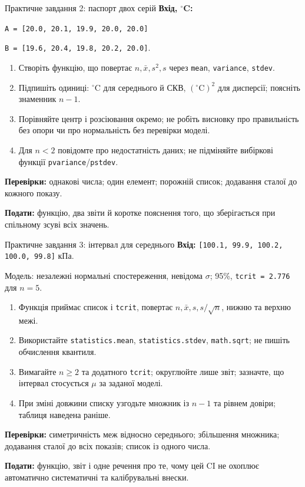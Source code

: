\documentclass[aspectratio=169,11pt]{beamer}
\begin{document}
\begin{frame}{Практичне завдання 2: паспорт двох серій}
\small
\textbf{Вхід, $^\circ$C:}\par
\texttt{A = [20.0, 20.1, 19.9, 20.0, 20.0]}\par
\texttt{B = [19.6, 20.4, 19.8, 20.2, 20.0]}.
\begin{enumerate}
\item Створіть функцію, що повертає $n,\bar x,s^2,s$ через \texttt{mean}, \texttt{variance}, \texttt{stdev}.
\item Підпишіть одиниці: $^\circ$C для середнього й СКВ, $({}^\circ\mathrm C)^2$ для дисперсії; поясніть знаменник $n-1$.
\item Порівняйте центр і розсіювання окремо; не робіть висновку про правильність без опори чи про нормальність без перевірки моделі.
\item Для $n<2$ повідомте про недостатність даних; не підміняйте вибіркові функції \texttt{pvariance}/\texttt{pstdev}.
\end{enumerate}
\textbf{Перевірки:} однакові числа; один елемент; порожній список; додавання сталої до кожного показу.
\medskip

\textbf{Подати:} функцію, два звіти й коротке пояснення того, що зберігається при спільному зсуві всіх значень.
\end{frame}

\begin{frame}{Практичне завдання 3: інтервал для середнього}
\small
\textbf{Вхід:} \texttt{[100.1, 99.9, 100.2, 100.0, 99.8]} кПа.\par
Модель: незалежні нормальні спостереження, невідома $\sigma$; 95\%, \texttt{tcrit = 2.776} для $n=5$.
\begin{enumerate}
\item Функція приймає список і \texttt{tcrit}, повертає $n,\bar x,s,s/\sqrt n$, нижню та верхню межі.
\item Використайте \texttt{statistics.mean}, \texttt{statistics.stdev}, \texttt{math.sqrt}; не пишіть обчислення квантиля.
\item Вимагайте $n\ge2$ та додатного \texttt{tcrit}; округлюйте лише звіт; зазначте, що інтервал стосується $\mu$ за заданої моделі.
\item При зміні довжини списку узгодьте множник із $n-1$ та рівнем довіри; таблиця наведена раніше.
\end{enumerate}
\textbf{Перевірки:} симетричність меж відносно середнього; збільшення множника; додавання сталої до всіх показів; список із одного числа.
\medskip

\textbf{Подати:} функцію, звіт і одне речення про те, чому цей CI не охоплює автоматично систематичні та калібрувальні внески.
\end{frame}
\end{document}
